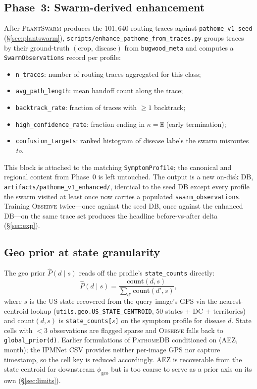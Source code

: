\documentclass[11pt,twocolumn]{article}
\newcommand{\observe}{\textsc{Observe}\xspace}
\newcommand{\plantswarm}{\textsc{PlantSwarm}\xspace}
\newcommand{\pathomedb}{\textsc{PathomeDB}\xspace}
\newcommand{\kH}{\texttt{H}\xspace}
\begin{document}
\subsection{Phase~3: Swarm-derived enhancement}
\label{sec:swarmobs}

After \plantswarm produces the $101{,}640$
routing traces against \texttt{pathome\_v1\_seed}
(\S\ref{sec:plantswarm}),
\texttt{scripts/enhance\_pathome\_from\_traces.py}
groups traces by their ground-truth
$(\text{crop},\,\text{disease})$ from
\texttt{bugwood\_meta} and computes a
\texttt{SwarmObservations} record per profile:
\begin{itemize}
  \item \texttt{n\_traces}: number of routing
    traces aggregated for this class;
  \item \texttt{avg\_path\_length}: mean handoff
    count along the trace;
  \item \texttt{backtrack\_rate}: fraction of
    traces with $\geq{1}$ backtrack;
  \item \texttt{high\_confidence\_rate}: fraction
    ending in $\kappa{=}\kH$ (early termination);
  \item \texttt{confusion\_targets}: ranked
    histogram of disease labels the swarm
    misroutes \emph{to}.
\end{itemize}
This block is attached to the matching
\texttt{SymptomProfile}; the canonical and
regional content from Phase~0 is left untouched.
The output
is a new on-disk DB,
\texttt{artifacts/pathome\_v1\_enhanced/},
identical to the seed DB except every profile
the swarm visited at least once now carries a
populated \texttt{swarm\_observations}.
Training \observe twice---once against the
seed DB, once against the enhanced DB---on
the same trace set produces the headline
before-vs-after delta (\S\ref{sec:exp}).

\subsection{Geo prior at state granularity}
\label{sec:geoprior}

The geo prior $\hat{P}(d \mid s)$ reads off the
profile's \texttt{state\_counts} directly:
\begin{equation}
  \hat{P}(d \mid s) =
  \frac{\mathrm{count}(d, s)}
       {\sum_{d'} \mathrm{count}(d', s)},
  \label{eq:density}
\end{equation}
where $s$ is the US state recovered from the
query image's GPS via the nearest-centroid
lookup
(\texttt{utils.geo.US\_STATE\_CENTROID}, $50$
states $+$ DC $+$ territories) and
$\mathrm{count}(d, s)$ is
\texttt{state\_counts[$s$]} on the symptom
profile for disease $d$. State cells with
$<3$ observations are flagged sparse and
\observe falls back to
\texttt{global\_prior(d)}. Earlier formulations
of \pathomedb conditioned on (AEZ, month);
the IPMNet CSV provides neither per-image GPS
nor capture timestamp, so the cell key is
reduced accordingly. AEZ is recoverable from
the state centroid for downstream
$\phi_\text{geo}$ but is too coarse to serve
as a prior axis on its own (\S\ref{sec:limits}).
\end{document}

